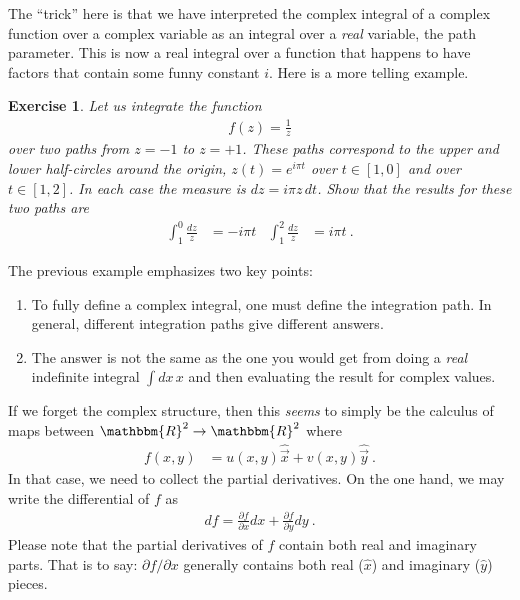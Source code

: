 \documentclass[
  11pt,
	colorful,
	raggedright,
]{tufte-style-thesis-flip}
\newtheorem{exercise}{Exercise}[section]
\begin{document}
The ``trick'' here is that we have interpreted the complex integral of a complex function over a complex variable as an integral over a \emph{real} variable, the path parameter. This is now a real integral over a function that happens to have factors that contain some funny constant $i$.  Here is a more telling example. 
\begin{exercise}
Let us integrate the function
\begin{align}
  f(z) = \frac{1}{z}
\end{align}
over two paths from $z=-1$ to $z=+1$. These paths correspond to the upper and lower half-circles around the origin, $z(t)= e^{i\pi t} $ over $t\in[1,0]$ and over $t\in[1,2]$. In each case the measure is $dz = i\pi z \, dt$. Show that the results for these two paths are
\begin{align}
  \int_1^0 \frac{dz}{z} &= -i\pi t 
  &
  \int_1^2 \frac{dz}{z} &= i\pi t  \ .
\end{align}
\end{exercise}
The previous example emphasizes two key points:
\begin{enumerate}
  \item To fully define a complex integral, one must define the integration path. In general, different integration paths give different answers. 
  \item The answer is not the same as the one you would get from doing a \emph{real} indefinite integral $\int dx\, x$ and then evaluating the result for complex values.
\end{enumerate}

If we forget the complex structure, then this \emph{seems} to simply be the calculus of maps between $\mathbbm{R}^2 \to \mathbbm{R}^2$ where
\begin{align}
  f(x,y) &= u(x,y) \hat{\vec{x}} + v(x,y)\hat{\vec{y}} \ .
\end{align}
In that case, we need to collect the partial derivatives. On the one hand, we may write the differential of $f$ as
\begin{align}
  df = \frac{\partial f}{\partial x} dx + \frac{\partial f}{\partial y} dy \ .
\end{align}
Please note that the partial derivatives of $f$ contain both real and imaginary parts. That is to say: $\partial f/\partial x$ generally contains both real ($\hat x$) and imaginary ($\hat y$) pieces. 
\end{document}
